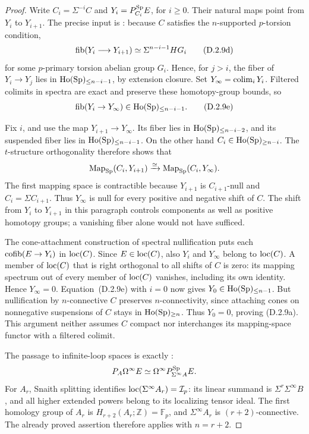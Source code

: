 \begin{proof}
Write $C_i=\Sigma^{-i}C$ and $Y_i=P_{C_i}^{\mathrm{Sp}}E$, for
$i\geq0$. Their natural maps point from $Y_i$ to $Y_{i+1}$.
The precise input is \citet[Theorem~2.6]{Bousfield1996ULP}:
because $C$ satisfies the $n$-supported $p$-torsion condition,
\[
 \operatorname{fib}(Y_i\longrightarrow Y_{i+1})
   \simeq\Sigma^{n-i-1}HG_i
 \tag{D.2.9d}
\]
for some $p$-primary torsion abelian group $G_i$. Hence, for
$j>i$, the fiber of $Y_i\to Y_j$ lies in
$\operatorname{Ho}(\mathrm{Sp})_{\leq n-i-1}$, by extension closure. Set
$Y_\infty=\operatorname*{colim}_iY_i$. Filtered colimits in spectra are exact
and preserve these homotopy-group bounds, so
\[
 \operatorname{fib}(Y_i\to Y_\infty)\in\operatorname{Ho}(\mathrm{Sp})_{\leq n-i-1}.
 \tag{D.2.9e}
\]

Fix $i$, and use the map $Y_{i+1}\to Y_\infty$. Its fiber lies
in $\operatorname{Ho}(\mathrm{Sp})_{\leq n-i-2}$, and its suspended fiber lies in
$\operatorname{Ho}(\mathrm{Sp})_{\leq n-i-1}$. On the other hand
$C_i\in\operatorname{Ho}(\mathrm{Sp})_{\geq n-i}$. The $t$-structure orthogonality
therefore shows that
\[
 \operatorname{Map}_{\mathrm{Sp}}(C_i,Y_{i+1})
   \xrightarrow{\simeq}\operatorname{Map}_{\mathrm{Sp}}(C_i,Y_\infty).
\]
The first mapping space is contractible because $Y_{i+1}$ is
$C_{i+1}$-null and $C_i=\Sigma C_{i+1}$. Thus $Y_\infty$ is
null for every positive and negative shift of $C$. The shift from
$Y_i$ to $Y_{i+1}$ in this paragraph controls components as well
as positive homotopy groups; a vanishing fiber alone would not
have sufficed.

The cone-attachment construction of spectral nullification puts
each $\operatorname{cofib}(E\to Y_i)$ in $\operatorname{loc}(C)$. Since $E\in\operatorname{loc}(C)$,
also $Y_i$ and $Y_\infty$ belong to $\operatorname{loc}(C)$. A member of
$\operatorname{loc}(C)$ that is right orthogonal to all shifts of $C$ is zero:
its mapping spectrum out of every member of $\operatorname{loc}(C)$ vanishes,
including its own identity. Hence $Y_\infty=0$.
Equation~\textup{(D.2.9e)} with $i=0$ now gives
$Y_0\in\operatorname{Ho}(\mathrm{Sp})_{\leq n-1}$. But nullification by
$n$-connective $C$ preserves $n$-connectivity, since attaching
cones on nonnegative suspensions of $C$ stays in
$\operatorname{Ho}(\mathrm{Sp})_{\geq n}$. Thus $Y_0=0$, proving
\textup{(D.2.9a)}. This argument neither assumes $C$ compact
nor interchanges its mapping-space functor with a filtered
colimit.

The passage to infinite-loop spaces is exactly
\citet[Theorem~2.10 and Proposition~3.1]{Bousfield1996ULP}:
\[
 P_A\Omega^\infty E
   \simeq\Omega^\infty P_{\Sigma^\infty A}^{\mathrm{Sp}}E.
\]
For $A_r$, Snaith splitting identifies
$\operatorname{loc}(\Sigma^\infty A_r)=\mathcal I_p$: its linear summand is
$\Sigma^r\Sigma^\infty B$, and all higher extended powers
belong to its localizing tensor ideal. The first homology group
of $A_r$ is $H_{r+2}(A_r;\mathbb Z)=\mathbb F_p$, and
$\Sigma^\infty A_r$ is $(r+2)$-connective. The already proved
assertion therefore applies with $n=r+2$.


\end{proof}
